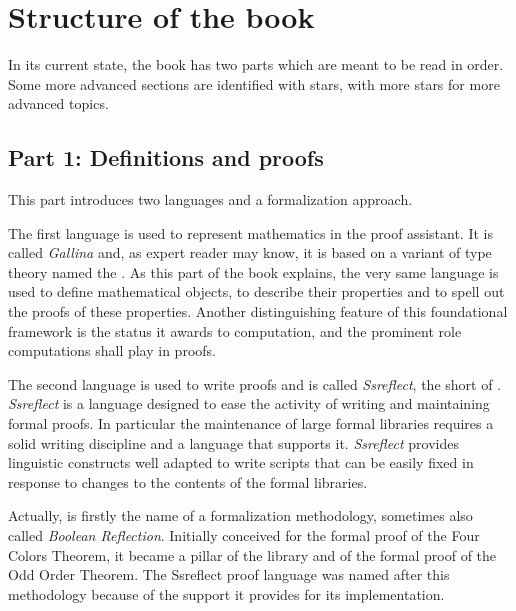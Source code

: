\section*{Structure of the book}


In its current state, the book has two parts which are meant to be
read in order. Some more advanced sections are identified with stars,
with more stars for more advanced topics.

\subsection*{Part 1: Definitions and proofs}

This part introduces two languages and a formalization approach.

The first language is used to represent mathematics in
the \Coq{} proof assistant. It is called \emph{Gallina} and, as expert
reader may know, it is based on a variant of type theory named the
\mcbCIC{}. As this part of the book explains, the very same language is
used to define mathematical objects, to describe their properties and
to spell out the proofs of these properties. Another distinguishing
feature of this foundational framework is the status it awards to
computation, and the prominent role computations shall play in proofs.

The second language is used to write proofs and is called \emph{Ssreflect},
the short of \mcbSSR{}.
\emph{Ssreflect} is a language designed to
ease the activity of writing and maintaining formal proofs.
In particular the maintenance of large
formal libraries requires a solid writing discipline
and a language that supports it.
\emph{Ssreflect} provides linguistic constructs well adapted to 
write scripts that can be easily fixed in response to %
changes to the contents of the formal libraries.

Actually, \mcbSSR{} is firstly the name of a
formalization methodology, sometimes also called \emph{Boolean Reflection}. 
Initially conceived for  the formal proof
of the Four Colors Theorem, it became a pillar of the \mcbMC{}
library and of the formal proof of the Odd Order
Theorem. The Ssreflect proof language was named after this methodology
because of the support it provides for its implementation.

